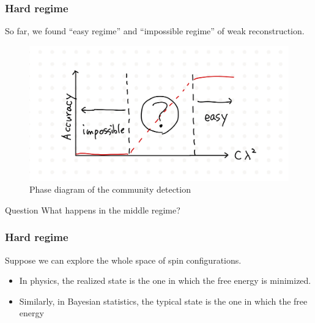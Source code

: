 \documentclass[dvipdfmx,11pt]{beamer}
\begin{document}
\begin{frame}
  \frametitle{Hard regime}
  So far, we found ``easy regime'' and ``impossible regime'' of weak reconstruction.
  \begin{figure}
    \centering
    \includegraphics[width=0.7\linewidth]{figure/phase2.jpeg}
    \caption{Phase diagram of the community detection}
  \end{figure}

  \begin{block}{Question}
    What happens in the middle regime?
  \end{block}

\end{frame}

\begin{frame}
  \frametitle{Hard regime}
  Suppose we can explore the whole space of spin configurations.
  \begin{itemize}
    \item In physics, the realized state is the one in which the \alert{free energy} is minimized.
    \item Similarly, in Bayesian statistics, the typical state is the one in which the free energy
    
  \end{itemize}

  

\end{frame}
\end{document}
